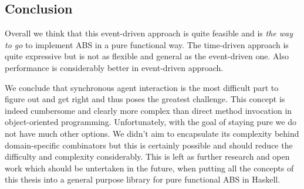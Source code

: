 
\subsection{Conclusion}
Overall we think that this event-driven approach is quite feasible and is \textit{the way to go} to implement ABS in a pure functional way. The time-driven approach is quite expressive but is not as flexible and general as the event-driven one. Also performance is considerably better in event-driven approach.

We conclude that synchronous agent interaction is the most difficult part to figure out and get right and thus poses the greatest challenge. This concept is indeed cumbersome and clearly more complex than direct method invocation in object-oriented programming. Unfortunately, with the goal of staying pure we do not have much other options. We didn't aim to encapsulate its complexity behind domain-specific combinators but this is certainly possible and should reduce the difficulty and complexity considerably. This is left as further research and open work which should be untertaken in the future, when putting all the concepts of this thesis into a general purpose library for pure functional ABS in Haskell.

